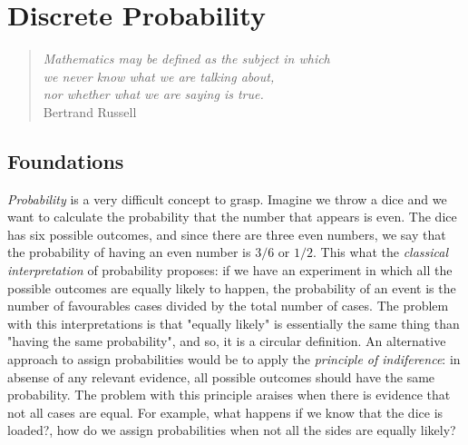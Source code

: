 %
%


\chapter{Discrete Probability}
\label{chap:Probability Theory}

\begin{quote}
\begin{flushright}
\emph{Mathematics may be defined as the subject in which\\
we never know what we are talking about,\\
nor whether what we are saying is true.}\\
Bertrand Russell
\end{flushright}
\end{quote}
\bigskip

%
%

\section{Foundations}
\label{sec:probability_foundations}

\emph{Probability} is a very difficult concept to grasp. Imagine we throw a dice and we want to calculate the probability that the number that appears is even. The dice has six possible outcomes, and since there are three even numbers, we say that the probability of having an even number is $3/6$ or $1/2$. This what the \emph{classical interpretation} of probability proposes: if we have an experiment in which all the possible outcomes are equally likely to happen, the probability of an event is the number of favourables cases divided by the total number of cases. The problem with this interpretations is that "equally likely" is essentially the same thing than "having the same probability", and so, it is a circular definition. An alternative approach to assign probabilities would be to apply the \emph{principle of indiference}: in absense of any relevant evidence, all possible outcomes should have the same probability. The problem with this principle araises when there is evidence that not all cases are equal. For example, what happens if we know that the dice is loaded?, how do we assign probabilities when not all the sides are equally likely?

